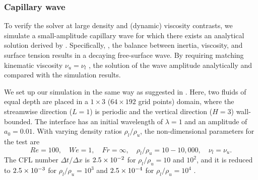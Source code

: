 



\subsubsection{Capillary wave}
\label{subsec: cap_wave}

To verify the solver at large density and (dynamic) viscosity contrasts, we simulate a small-amplitude capillary wave for which there exists an analytical solution derived by \cite{Prosperetti_1981}. Specifically, , the balance between inertia, viscosity, and surface tension results in a decaying free-surface wave. By requiring matching kinematic viscosity $\nu_u=\nu_l$ , the solution of the wave amplitude  analytically and compared with the simulation results. 

We set up our simulation in the same way as suggested in \cite{Dodd_JCP_2014}. Here, two fluids of equal depth are placed in a $1\times3$ ($64\times192$ grid points) domain, where the streamwise direction ($L=1$) is periodic and the vertical direction ($H=3$) wall-bounded. The interface has an initial wavelength of $\lambda=1$ and an amplitude of $a_0=0.01$. With varying density ratios $\rho_l/\rho_u$, the non-dimensional parameters for the test are
\begin{equation}
    Re=100, \quad We=1, \quad Fr=\infty, \quad \rho_l/\rho_u=10-10,000, \quad \nu_l=\nu_u.
  \label{capillary_wave_test}
\end{equation}
The CFL number $\Delta t/\Delta x$ is $2.5\times 10^{-2}$ for $\rho_l/\rho_u=10$ and $10^2$, and it is reduced to $2.5\times 10^{-3}$ for $\rho_l/\rho_u=10^3$ and $2.5\times 10^{-4}$ for $\rho_l/\rho_u=10^4$ .

